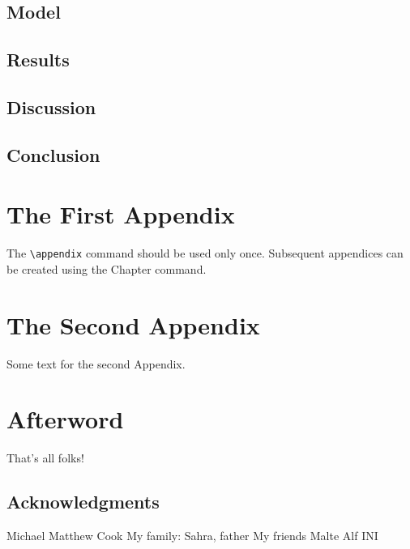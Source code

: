 \documentclass{report}
\begin{document}
\section{Model}

\section{Results}

\section{Discussion}

\section{Conclusion}

\appendix

\chapter{The First Appendix}

The \verb"\appendix" command should be used only once. Subsequent appendices can
be created using the Chapter command.

\chapter{The Second Appendix}

Some text for the second Appendix.




\chapter{Afterword}

That's all folks!

\section{Acknowledgments}

Michael
Matthew Cook
My family: Sahra, father
My friends Malte Alf
INI
\end{document}
